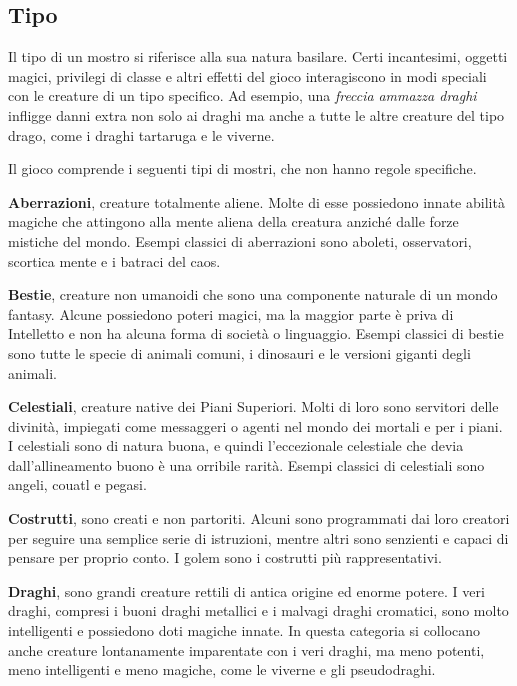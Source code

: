 \subsection{Tipo}

Il tipo di un mostro si riferisce alla sua natura basilare. Certi incantesimi, oggetti magici, privilegi di classe e altri effetti del gioco interagiscono in modi speciali con le creature di un tipo specifico. Ad esempio, una \emph{freccia} \emph{ammazza draghi} infligge danni extra non solo ai draghi ma anche a tutte le altre creature del tipo drago, come i draghi tartaruga e le viverne.

Il gioco comprende i seguenti tipi di mostri, che non hanno regole specifiche.

\medskip\textbf{Aberrazioni}, creature totalmente aliene. Molte di esse possiedono innate abilità magiche che attingono alla mente aliena della creatura anziché dalle forze mistiche del mondo. Esempi classici di aberrazioni sono aboleti, osservatori, scortica mente e i batraci del caos.

\medskip\textbf{Bestie}, creature non umanoidi che sono una componente naturale di un mondo fantasy. Alcune possiedono poteri magici, ma la maggior parte è priva di Intelletto e non ha alcuna forma di società o linguaggio. Esempi classici di bestie sono tutte le specie di animali comuni, i dinosauri e le versioni giganti degli animali. 

\medskip\textbf{Celestiali}, creature native dei Piani Superiori. Molti di loro sono servitori delle divinità, impiegati come messaggeri o agenti nel mondo dei mortali e per i piani.\\
I celestiali sono di natura buona, e quindi l'eccezionale celestiale che devia dall'allineamento buono è una orribile rarità. Esempi classici di celestiali sono angeli, couatl e pegasi.

\medskip\textbf{Costrutti}, sono creati e non partoriti. Alcuni sono programmati dai loro creatori per seguire una semplice serie di istruzioni, mentre altri sono senzienti e capaci di pensare per proprio conto. I golem sono i costrutti più rappresentativi.

\medskip\textbf{Draghi}, sono grandi creature rettili di antica origine ed enorme potere. I veri draghi, compresi i buoni draghi metallici e i malvagi draghi cromatici, sono molto intelligenti e possiedono doti magiche innate. In questa categoria si collocano anche creature lontanamente imparentate con i veri draghi, ma meno potenti, meno intelligenti e meno magiche, come le viverne e gli pseudodraghi.

